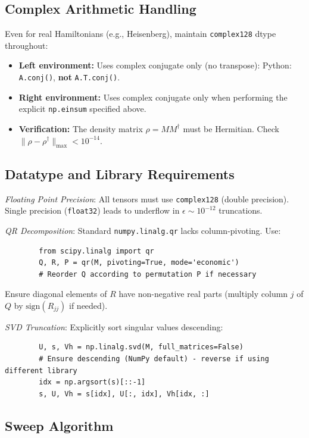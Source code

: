 \documentclass[aps,prb,onecolumn,scriptaddress]{revtex4-2}
\begin{document}
	\subsection{Complex Arithmetic Handling}
	Even for real Hamiltonians (e.g., Heisenberg), maintain \texttt{complex128} dtype throughout:
	\begin{itemize}
		\item \textbf{Left environment:} Uses complex conjugate only (no transpose): Python: \texttt{A.conj()}, \textbf{not} \texttt{A.T.conj()}.
		\item \textbf{Right environment:} Uses complex conjugate only when performing the explicit \texttt{np.einsum} specified above.
		\item \textbf{Verification:} The density matrix $\rho = M M^\dagger$ must be Hermitian. Check $\|\rho - \rho^\dagger\|_{\max} < 10^{-14}$.
	\end{itemize}
	
	\subsection{Datatype and Library Requirements}
	
	\textit{Floating Point Precision}: All tensors must use \texttt{complex128} (double precision). Single precision (\texttt{float32}) leads to underflow in $\epsilon \sim 10^{-12}$ truncations.
	
	\textit{QR Decomposition}: Standard \texttt{numpy.linalg.qr} lacks column-pivoting. Use:
	\begin{verbatim}
		from scipy.linalg import qr
		Q, R, P = qr(M, pivoting=True, mode='economic')
		# Reorder Q according to permutation P if necessary
	\end{verbatim}
	Ensure diagonal elements of $R$ have non-negative real parts (multiply column $j$ of $Q$ by $\text{sign}(R_{jj})$ if needed).
	
	\textit{SVD Truncation}: Explicitly sort singular values descending:
	\begin{verbatim}
		U, s, Vh = np.linalg.svd(M, full_matrices=False)
		# Ensure descending (NumPy default) - reverse if using different library
		idx = np.argsort(s)[::-1]
		s, U, Vh = s[idx], U[:, idx], Vh[idx, :]
	\end{verbatim}
	
	\subsection{Sweep Algorithm}
	
\end{document}
